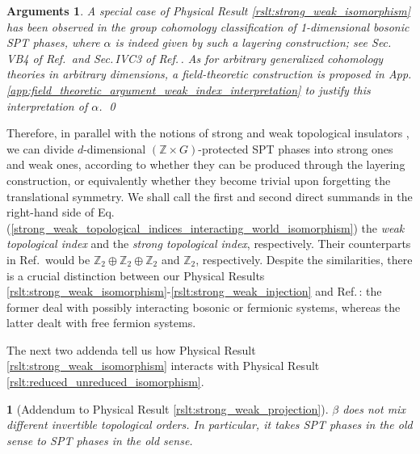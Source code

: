\documentclass[sort&compress]{elsarticle}
\theoremstyle{theoremstyle}
\theoremstyle{framedtheoremstyle}
\theoremstyle{definitionstyle}
\theoremstyle{definitionstyle}
\theoremstyle{definitionstyle}
\theoremstyle{definitionstyle}
\theoremstyle{nameddefinitionstyle}
\theoremstyle{framednameddefinitionstyle}
\newtheorem*{framednameddef}{}
\theoremstyle{proofstyle}
\newtheorem{ag}{Arguments}
\theoremstyle{definitionstyle}
\newcommand{\ZZZ}{\mathbb{Z}}
\newcommand{\paren}[1]{\left( #1 \right)}
\begin{document}
\begin{ag}
A special case of Physical Result \ref{rslt:strong_weak_isomorphism} has been observed in the group cohomology classification of 1-dimensional bosonic SPT phases, where $\alpha$ is indeed given by such a layering construction; see Sec.\,VB4 of Ref.\,\cite{Wen_1d} and Sec.\,IVC3 of Ref.\,\cite{Cirac}. As for arbitrary generalized cohomology theories in arbitrary dimensions, a field-theoretic construction is proposed in App.\,\ref{app:field_theoretic_argument_weak_index_interpretation} to justify this interpretation of $\alpha$.
\qed\end{ag}

Therefore, in parallel with the notions of strong and weak topological insulators \cite{weak_TI}, we can divide $d$-dimensional $\paren{\ZZZ \times G}$-protected SPT phases into strong ones and weak ones, according to whether they can be produced through the layering construction, or equivalently whether they become trivial upon forgetting the translational symmetry.
We shall call the first and second direct summands in the right-hand side of Eq.\,(\ref{strong_weak_topological_indices_interacting_world_isomorphism}) the \emph{weak topological index} and the \emph{strong topological index}, respectively.
Their counterparts in Ref.\,\cite{weak_TI} would be $\ZZZ_2 \oplus \ZZZ_2 \oplus \ZZZ_2$ and $\ZZZ_2$, respectively.
Despite the similarities, there is a crucial distinction between our Physical Results \ref{rslt:strong_weak_isomorphism}-\ref{rslt:strong_weak_injection} and Ref.\,\cite{weak_TI}: the former deal with possibly interacting bosonic or fermionic systems, whereas the latter dealt with free fermion systems.

The next two addenda tell us how Physical Result \ref{rslt:strong_weak_isomorphism} interacts with Physical Result \ref{rslt:reduced_unreduced_isomorphism}.

\begin{framed}\begin{framednameddef}[Addendum to Physical Result \ref{rslt:strong_weak_projection}]
$\beta$ does not mix different invertible topological orders.
In particular, it takes SPT phases in the old sense to SPT phases in the old sense.
\end{framednameddef}\end{framed}
\end{document}
